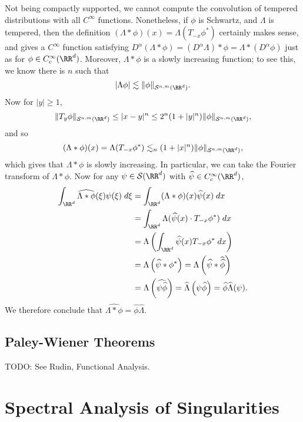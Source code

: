 Not being compactly supported, we cannot compute the convolution of tempered distributions with all $C^\infty$ functions. Nonetheless, if $\phi$ is Schwartz, and $\Lambda$ is tempered, then the definition $(\Lambda * \phi)(x) = \Lambda(T_{-x} \phi^*)$ certainly makes sense, and gives a $C^\infty$ function satisfying $D^\alpha(\Lambda * \phi) = (D^\alpha \Lambda) * \phi = \Lambda * (D^\alpha \phi)$ just as for $\phi \in C_c^\infty(\RR^d)$. Moreover, $\Lambda * \phi$ is a slowly increasing function; to see this, we know there is $n$ such that
%
\[ |\Lambda \phi| \lesssim \| \phi \|_{\mathcal{S}^{n,m}(\RR^d)}. \]
%
Now for $|y| \geq 1$,
%
\[ \| T_y \phi \|_{\mathcal{S}^{n,m}(\RR^d)} \leq |x-y|^n \leq 2^n (1 + |y|^n) \| \phi \|_{\mathcal{S}^{n,m}(\RR^d)}, \]
%
and so
%
\[ (\Lambda * \phi)(x) = \Lambda(T_{-x} \phi^*) \lesssim_n (1 + |x|^n) \| \phi \|_{\mathcal{S}^{n,m}(\RR^d)}, \]
%
which gives that $\Lambda * \phi$ is slowly increasing. In particular, we can take the Fourier transform of $\Lambda * \phi$. Now for any $\psi \in \mathcal{S}(\RR^d)$ with $\widehat{\psi} \in C_c^\infty(\RR^d)$,
%
\begin{align*}
  \int_{\RR^d} \widehat{\Lambda * \phi}(\xi) \psi(\xi)\; d\xi &= \int_{\RR^d} (\Lambda * \phi)(x) \widehat{\psi}(x)\; dx\\
  &= \int_{\RR^d} \Lambda( \widehat{\psi}(x) \cdot T_{-x} \phi^*)\; dx\\
  &= \Lambda \left( \int_{\RR^d} \widehat{\psi}(x) T_{-x} \phi^*\; dx \right)\\
  &= \Lambda \left( \widehat{\psi} * \phi^* \right) = \Lambda \left( \widehat{\psi} * \widehat{\widehat{\phi}} \right)\\
  &= \Lambda \left( \widehat{\psi \widehat{\phi}} \right) = \widehat{\Lambda} \left( \psi \widehat{\phi} \right) = \widehat{\phi} \widehat{\Lambda}(\psi).
\end{align*}
%
We therefore conclude that $\widehat{\Lambda * \phi} = \widehat{\phi} \widehat{\Lambda}$.

\section{Paley-Wiener Theorems}

TODO: See Rudin, Functional Analysis.








\chapter{Spectral Analysis of Singularities}

